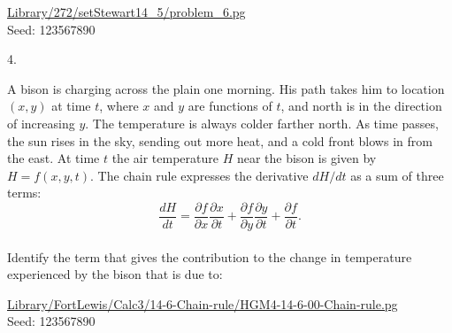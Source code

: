 \documentclass[10pt,]{book}
\theoremstyle{plain}
\theoremstyle{definition}
\theoremstyle{definition}
\theoremstyle{definition}
\theoremstyle{definition}
\theoremstyle{definition}
\numberwithin{equation}{section}
\begin{document}
\begin{exerciselist}
\begin{mdframed}
{}\par\vspace*{2ex}%
{\tiny\ttfamily\noindent\url{Library/272/setStewart14_5/problem_6.pg}\\Seed: 123567890\hfill}\end{mdframed}
\item[4.]\hypertarget{exercise-63}{}\mbox{}\\ %
\begin{mdframed}
{
A bison is charging across the plain one morning.  His
path takes him to location \((x,y)\) at time \(t\), 
where \(x\) and \(y\) are functions of \(t\), and 
north is in the direction of increasing \(y\).  The 
temperature is always colder farther north.  As time 
passes, the sun rises in the sky, sending out more heat,
and a cold front blows in from the east.  At time \(t\)
the air temperature \(H\) near the bison is given by
\(H = f(x,y,t)\).  The chain rule expresses the 
derivative \(dH / dt\) as a sum of three terms:
\leavevmode\\\relax 
\[\frac{dH}{dt} 
= 
\frac{\partial f}{\partial x} \frac{\partial x}{\partial t}
+
\frac{\partial f}{\partial y} \frac{\partial y}{\partial t}
+
\frac{\partial f}{\partial t}.\]
\leavevmode\\\relax 
Identify the term that gives the contribution to the 
change in temperature experienced by the bison that is
due to:
\leavevmode\\\relax 
\par\medskip\hbox{\qquad{}}\medskip\hbox{\qquad{}}\medskip


}\par\vspace*{2ex}%
{\tiny\ttfamily\noindent\url{Library/FortLewis/Calc3/14-6-Chain-rule/HGM4-14-6-00-Chain-rule.pg}\\Seed: 123567890\hfill}\end{mdframed}
\end{exerciselist}
\end{document}
